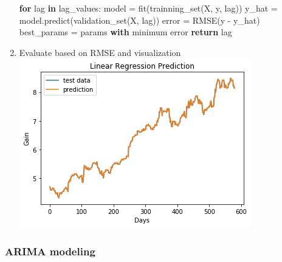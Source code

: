\documentclass[11pt]{article}
\makeatletter
\def\maxwidth{\ifdim\Gin@nat@width>\linewidth\linewidth
    \else\Gin@nat@width\fi}
\let\Oldincludegraphics\includegraphics
\renewcommand{\includegraphics}[1]{\Oldincludegraphics[width=.8\maxwidth]{#1}}
\newenvironment{Shaded}{}{}
\newcommand{\KeywordTok}[1]{\textcolor[rgb]{0.00,0.44,0.13}{\textbf{{#1}}}}
\newcommand{\NormalTok}[1]{{#1}}
\newcommand{\ControlFlowTok}[1]{\textcolor[rgb]{0.00,0.44,0.13}{\textbf{{#1}}}}
\newcommand{\OperatorTok}[1]{\textcolor[rgb]{0.40,0.40,0.40}{{#1}}}
\makeatother
\begin{document}
\begin{enumerate}
\begin{Shaded}
\begin{Highlighting}[]
\ControlFlowTok{for}\NormalTok{ lag }\KeywordTok{in}\NormalTok{ lag_values:}
\NormalTok{    model }\OperatorTok{=}\NormalTok{ fit(trainning_set(X, y, lag))}
\NormalTok{    y_hat }\OperatorTok{=}\NormalTok{ model.predict(validation_set(X, lag))}
\NormalTok{    error }\OperatorTok{=}\NormalTok{ RMSE(y }\OperatorTok{-}\NormalTok{ y_hat)}
\NormalTok{    best_params }\OperatorTok{=}\NormalTok{ params }\ControlFlowTok{with}\NormalTok{ minimum error}
\ControlFlowTok{return}\NormalTok{ lag}
\end{Highlighting}
\end{Shaded}
\item
  Evaluate based on RMSE and visualization
  \includegraphics{./figures/17.jpg}
\end{enumerate}

\subsubsection{ARIMA modeling}\label{arima-modeling}
\end{document}
